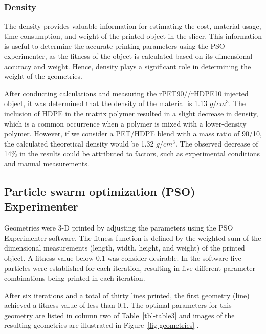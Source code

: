 \documentclass[
]{article}
\begin{document}
\hypertarget{density-1}{%
\subsubsection{Density}\label{density-1}}

The density provides valuable information for estimating the cost,
material usage, time consumption, and weight of the printed object in
the slicer. This information is useful to determine the accurate
printing parameters using the PSO experimenter, as the fitness of the
object is calculated based on its dimensional accuracy and weight.
Hence, density plays a significant role in determining the weight of the
geometries.

After conducting calculations and measuring the rPET90//rHDPE10 injected
object, it was determined that the density of the material is 1.13
\(g/cm^{3}\). The inclusion of HDPE in the matrix polymer resulted in a
slight decrease in density, which is a common occurrence when a polymer
is mixed with a lower-density polymer. However, if we consider a
PET/HDPE blend with a mass ratio of 90/10, the calculated theoretical
density would be 1.32 \(g/cm^{3}\). The observed decrease of 14\% in the
results could be attributed to factors, such as experimental conditions
and manual measurements.

\hypertarget{particle-swarm-optimization-pso-experimenter}{%
\subsection{Particle swarm optimization (PSO)
Experimenter}\label{particle-swarm-optimization-pso-experimenter}}

Geometries were 3-D printed by adjusting the parameters using the PSO
Experimenter software. The fitness function is defined by the weighted
sum of the dimensional measurements (length, width, height, and weight)
of the printed object. A fitness value below 0.1 was consider desirable.
In the software five particles were established for each iteration,
resulting in five different parameter combinations being printed in each
iteration.

After six iterations and a total of thirty lines printed, the first
geometry (line) achieved a fitness value of less than 0.1. The optimal
parameters for this geometry are listed in column two of
Table~\ref{tbl-table3} and images of the resulting geometries are
illustrated in Figure~\ref{fig-geometries} .
\end{document}
